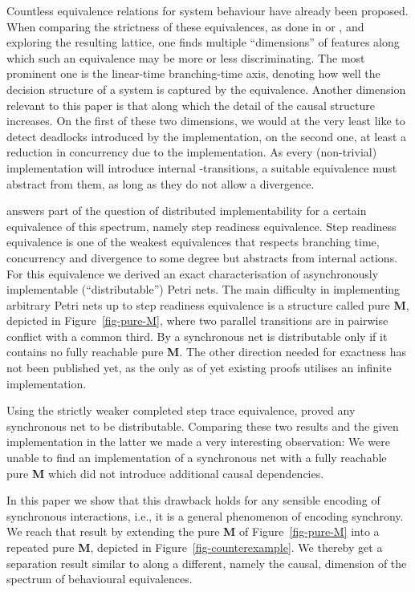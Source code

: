 \documentclass[submission,copyright,creativecommons]{eptcs}
\theoremstyle{definition}
\def\figurename{Figure}
\newcommand{\reffig}[1]{\figurename~\ref{fig-#1}}
\begin{document}
Countless equivalence relations for system behaviour have already been proposed.
When comparing the strictness of these equivalences, as done in
\cite{vanglabbeek93linear} or \cite{vanglabbeek01refinement},
and exploring the resulting lattice,
one finds multiple ``dimensions'' of features along which such an equivalence
may be more or less discriminating.
The most prominent one is the linear-time branching-time axis, denoting how well
the decision structure of a system is captured by the equivalence.
Another dimension relevant to this paper is that along which the detail of
the causal structure increases.
On the first of these two dimensions, we would at the very least like to detect
deadlocks introduced by the implementation, on the second one, at least a
reduction in concurrency due to the implementation.
As every (non-trivial) implementation will introduce internal -transitions,
a suitable equivalence must abstract from them, as long as they do not
allow a divergence.

\cite{glabbeek08syncasyncinteraction} answers part of the question of
distributed implementability for a certain equivalence of this spectrum, namely step
readiness equivalence.
Step readiness equivalence is one of the weakest equivalences that
respects branching time, concurrency and divergence
to some degree but
abstracts from internal actions. For this equivalence we derived an
exact characterisation of asynchronously implementable (``distributable'')
Petri nets.
The main difficulty in implementing arbitrary Petri nets up to step readiness
equivalence is a structure called pure \textbf{M}, depicted in \reffig{pure-M},
where two parallel transitions are in pairwise conflict with a common third.
By \cite{glabbeek08syncasyncinteraction} a synchronous net is distributable
only if it contains no fully reachable pure \textbf{M}. The other direction needed
for exactness has not been published yet, as the only as of yet existing proofs
utilises an infinite implementation.

Using the strictly weaker completed step trace equivalence,
\cite{schicke09synchrony} proved any synchronous net to be distributable.
Comparing these two results and the given implementation in the latter we made
a very interesting observation: We were unable to find an implementation of a
synchronous net with a fully reachable pure \textbf{M} which did not introduce
additional causal dependencies.

In this paper we show that this drawback holds for any sensible encoding of
synchronous interactions, i.e., it is a general phenomenon of encoding
synchrony. We reach that result by extending the pure \textbf{M} of \reffig{pure-M}
into a repeated pure \textbf{M}, depicted in \reffig{counterexample}.
We thereby get a separation result similar to
\cite{glabbeek08syncasyncinteraction} along a different, namely the causal,
dimension of the spectrum of behavioural equivalences.
\end{document}

